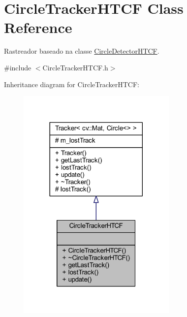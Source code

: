 \hypertarget{class_viscv_1_1_circle_tracker_h_t_c_f}{}\section{Circle\+Tracker\+H\+T\+C\+F Class Reference}
\label{class_viscv_1_1_circle_tracker_h_t_c_f}


Rastreador baseado na classe \hyperlink{class_viscv_1_1_circle_detector_h_t_c_f}{Circle\+Detector\+H\+T\+C\+F}.  




{\ttfamily \#include $<$Circle\+Tracker\+H\+T\+C\+F.\+h$>$}



Inheritance diagram for Circle\+Tracker\+H\+T\+C\+F\+:
\nopagebreak
\begin{figure}[H]
\begin{center}
\leavevmode
\includegraphics[width=221pt]{class_viscv_1_1_circle_tracker_h_t_c_f__inherit__graph}
\end{center}
\end{figure}


